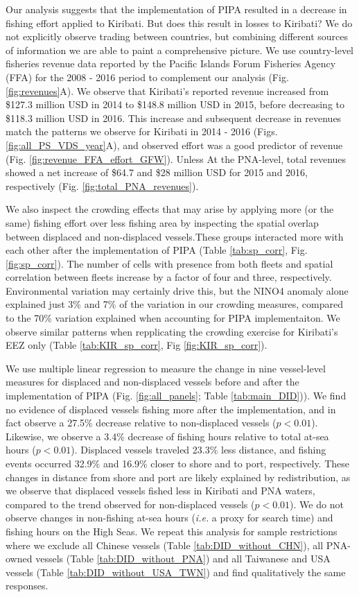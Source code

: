 \documentclass[12pt]{article}
\begin{document}
Our analysis suggests that the implementation of PIPA resulted in a decrease in fishing effort applied to Kiribati. But does this result in losses to Kiribati? We do not explicitly observe trading between countries, but combining different sources of information we are able to paint a comprehensive picture. We use country-level fisheries revenue data reported by the Pacific Islands Forum Fisheries Agency (FFA) for the 2008 - 2016 period to complement our analysis (Fig. \ref{fig:revenues}A). We observe that Kiribati's reported revenue increased from \$127.3 million USD in 2014 to \$148.8 million USD in 2015, before decreasing to \$118.3 million USD in 2016. This increase and subsequent decrease in revenues match the patterns we observe for Kiribati in 2014 - 2016 (Figs. \ref{fig:all_PS_VDS_year}A), and observed effort was a good predictor of revenue (Fig. \ref{fig:revenue_FFA_effort_GFW}). Unless At the PNA-level, total revenues showed a net increase of \$64.7 and \$28 million USD for 2015 and 2016, respectively (Fig. \ref{fig:total_PNA_revenues}).

We also inspect the crowding effects that may arise by applying more (or the same) fishing effort over less fishing area by inspecting the spatial overlap between displaced and non-displaced vessels.These groups interacted more with each other after the implementation of PIPA (Table \ref{tab:sp_corr}, Fig. \ref{fig:sp_corr}). The number of cells with presence from both fleets and spatial correlation between fleets increase by a factor of four and three, respectively. Environmental variation may certainly drive this, but the NINO4 anomaly alone explained just 3\% and 7\% of the variation in our crowding measures, compared to the 70\% variation explained when accounting for PIPA implementaiton. We observe similar patterns when repplicating the crowding exercise for Kiribati's EEZ only (Table \ref{tab:KIR_sp_corr}, Fig \ref{fig:KIR_sp_corr}).

We use multiple linear regression to measure the change in nine vessel-level measures for displaced and non-displaced vessels before and after the implementation of PIPA (Fig. \ref{fig:all_panels}; Table \ref{tab:main_DID})). We find no evidence of displaced vessels fishing more after the implementation, and in fact observe a 27.5\% decrease relative to non-displaced vessels ($p < 0.01$). Likewise, we observe a 3.4\% decrease of fishing hours relative to total at-sea hours ($p < 0.01$). Displaced vessels traveled 23.3\% less distance, and fishing events occurred 32.9\% and 16.9\% closer to shore and to port, respectively. These changes in distance from shore and port are likely explained by redistribution, as we observe that displaced vessels fished less in Kiribati and PNA waters, compared to the trend observed for non-displaced vessels ($p < 0.01$). We do not observe changes in non-fishing at-sea hours (\emph{i.e.} a proxy for search time) and fishing hours on the High Seas. We repeat this analysis for sample restrictions where we exclude all Chinese vessels (Table \ref{tab:DID_without_CHN}), all PNA-owned vessels (Table \ref{tab:DID_without_PNA}) and all Taiwanese and USA vessels (Table \ref{tab:DID_without_USA_TWN}) and find qualitatively the same responses.
\end{document}
